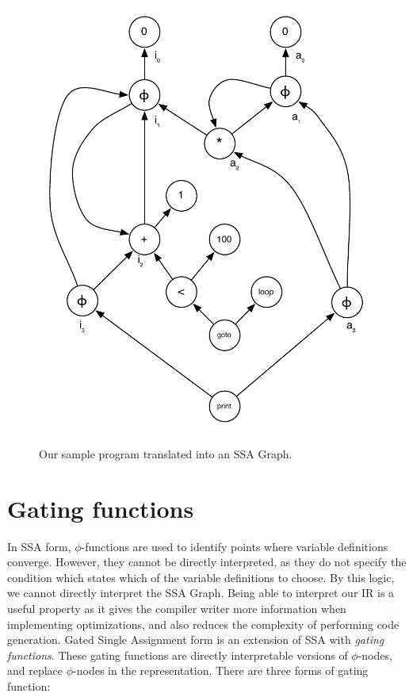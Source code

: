 \begin{figure}
\centering
\includegraphics[scale=0.5]{ssa-graph.pdf}
\label{fig: ssa-graph-example-graph}
\caption{Our sample program translated into an SSA Graph.}
\end{figure}

\section{Gating functions}

In SSA form, $\phi$-functions are used to identify points where variable definitions converge. However, they cannot be directly interpreted, as they do not specify the condition which states which of the variable definitions to choose. By this logic, we cannot directly interpret the SSA Graph. Being able to interpret our IR is a useful property as it gives the compiler writer more information when implementing optimizations, and also reduces the complexity of performing code generation. Gated Single Assignment form  is an extension of SSA with \textit{gating functions}. These gating functions are directly interpretable versions of $\phi$-nodes, and replace $\phi$-nodes in the representation. There are three forms of gating function:

